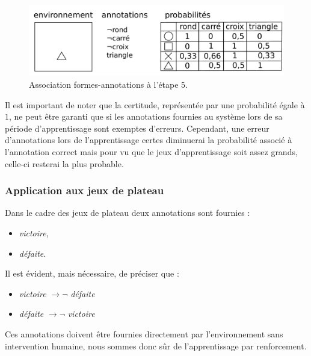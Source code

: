 \begin{figure}[H] 
\includegraphics[width=\textwidth]{files/raisonneur/annotations_5} 
\caption{Association formes-annotations à l'étape 5.} 
\label{img_annotations_5}
\end{figure}

Il est important de noter que la certitude, représentée par une probabilité égale à $1$, ne peut être garanti que si les annotations fournies au système lors de sa période d'apprentissage sont exemptes d'erreurs. Cependant, une erreur d'annotations lors de l'apprentissage certes diminuerai la probabilité associé à l'annotation correct mais pour vu que le jeux d'apprentissage soit assez grands, celle-ci resterai la plus probable.

\subsubsection{Application aux jeux de plateau}

Dans le cadre des jeux de plateau deux annotations sont fournies :
\begin{itemize}
\item \emph{victoire},
\item \emph{défaite}.
\end{itemize}
Il est évident, mais nécessaire, de préciser que :
\begin{itemize}
\item \emph{victoire} $\rightarrow{}\neg{}$ \emph{défaite}
\item \emph{défaite} $\rightarrow{}\neg{}$ \emph{victoire}
\end{itemize}

Ces annotations doivent être fournies directement par l'environnement sans intervention humaine, nous sommes donc sûr de l'apprentissage par renforcement.
